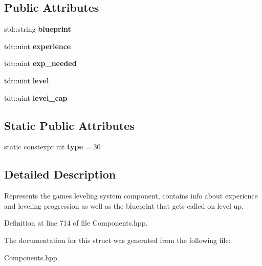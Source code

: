 \subsection*{Public Attributes}
\begin{DoxyCompactItemize}
\item 
std\+::string {\bfseries blueprint}\hypertarget{struct_upgrade_component_a1c8235c9cd5adb1404edf5a4649f363e}{}\label{struct_upgrade_component_a1c8235c9cd5adb1404edf5a4649f363e}

\item 
tdt\+::uint {\bfseries experience}\hypertarget{struct_upgrade_component_a3c3b93a56ba521102d671b78c0ca4f34}{}\label{struct_upgrade_component_a3c3b93a56ba521102d671b78c0ca4f34}

\item 
tdt\+::uint {\bfseries exp\+\_\+needed}\hypertarget{struct_upgrade_component_ab7c4f3c857e3d3a50b744087de98854d}{}\label{struct_upgrade_component_ab7c4f3c857e3d3a50b744087de98854d}

\item 
tdt\+::uint {\bfseries level}\hypertarget{struct_upgrade_component_a1efa01000f6bbe592174640a98da2d77}{}\label{struct_upgrade_component_a1efa01000f6bbe592174640a98da2d77}

\item 
tdt\+::uint {\bfseries level\+\_\+cap}\hypertarget{struct_upgrade_component_ab4e7fd44247ca15360e9dd58fd7ddd14}{}\label{struct_upgrade_component_ab4e7fd44247ca15360e9dd58fd7ddd14}

\end{DoxyCompactItemize}
\subsection*{Static Public Attributes}
\begin{DoxyCompactItemize}
\item 
static constexpr int {\bfseries type} = 30\hypertarget{struct_upgrade_component_a2f60d71c1d1e255be9996289ddb8c119}{}\label{struct_upgrade_component_a2f60d71c1d1e255be9996289ddb8c119}

\end{DoxyCompactItemize}


\subsection{Detailed Description}
Represents the game\textquotesingle{}s leveling system component, contains info about experience and leveling progression as well as the blueprint that gets called on level up. 

Definition at line 714 of file Components.\+hpp.



The documentation for this struct was generated from the following file\+:\begin{DoxyCompactItemize}
\item 
Components.\+hpp\end{DoxyCompactItemize}
